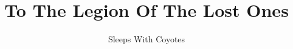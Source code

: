 \documentclass[halfletter,14pt,oneside,onecolumn,openleft]{memoir}
\title{To The Legion Of The Lost Ones}
\author{Sleeps With Coyotes}
\date{}
\begin{document}
\frontmatter
\begin{titlingpage}

\end{titlingpage}
\cleardoublepage
\cleardoublepage
\mainmatter




\backmatter
\end{document}
